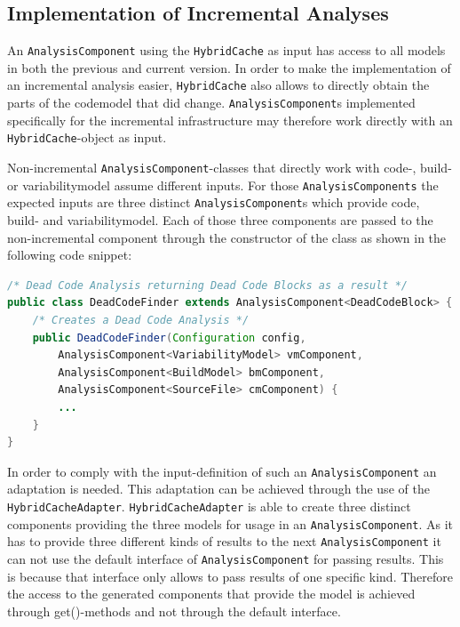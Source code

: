 \documentclass[a4paper]{article}
\begin{document}
\subsection{Implementation of Incremental Analyses}

An \texttt{AnalysisComponent} using the \texttt{HybridCache} as input has access to all models in both the previous and current version. In order to make the implementation of an incremental analysis easier, \texttt{HybridCache} also allows to directly obtain the parts of the codemodel that did change. \texttt{AnalysisComponent}s implemented specifically for the incremental infrastructure may therefore work directly with an \texttt{HybridCache}-object as input. 

Non-incremental \texttt{AnalysisComponent}-classes that directly work with code-, build- or variabilitymodel assume different inputs. For those \texttt{AnalysisComponents} the expected inputs are three distinct \texttt{AnalysisComponent}s which provide code, build- and variabilitymodel. Each of those three components are passed to the non-incremental component through the constructor of the class as shown in the following code snippet:

\begin{lstlisting}[language=java]
/* Dead Code Analysis returning Dead Code Blocks as a result */
public class DeadCodeFinder extends AnalysisComponent<DeadCodeBlock> {
    /* Creates a Dead Code Analysis */
    public DeadCodeFinder(Configuration config, 
        AnalysisComponent<VariabilityModel> vmComponent, 
        AnalysisComponent<BuildModel> bmComponent, 
        AnalysisComponent<SourceFile> cmComponent) {
        ...
    }
}
\end{lstlisting}

In order to comply with the input-definition of such an \texttt{AnalysisComponent} an adaptation is needed. This adaptation can be achieved through the use of the \texttt{HybridCacheAdapter}. \texttt{HybridCacheAdapter} is able to create three distinct components providing the three models for usage in an \texttt{AnalysisComponent}. As it has to provide three different kinds of results to the next \texttt{AnalysisComponent} it can not use the default interface of \texttt{AnalysisComponent} for passing results. This is because that interface only allows to pass results of one specific kind. Therefore the access to the generated components that provide the model is achieved through get()-methods and not through the default interface. 
\end{document}
